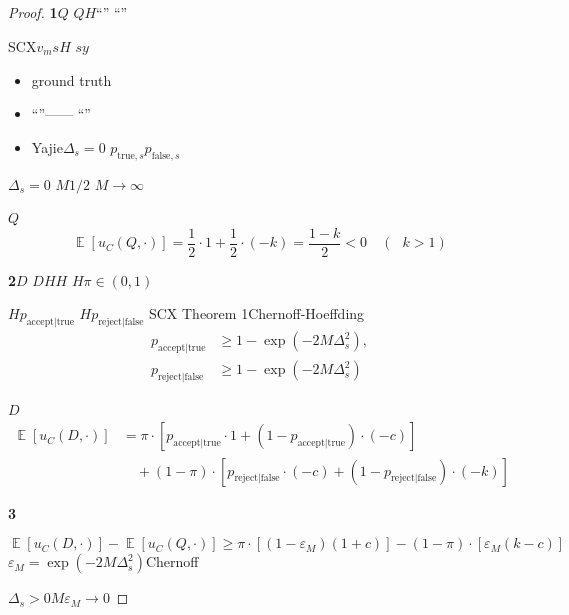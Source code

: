 \documentclass[11pt,a4paper]{article}
\theoremstyle{remark}
\DeclareMathOperator{\E}{\mathbb{E}}
\begin{document}
\subsection{}

\begin{proof}
\textbf{1$Q$}
$Q$$H$``''
``''

SCX$v_m$$s$$H$
$s$$y$
\begin{itemize}
    \item ground truth
    \item ``''——
          ``''
    \item Yajie$\Delta_s = 0$
          $p_{\text{true}, s}$$p_{\text{false}, s}$
\end{itemize}

$\Delta_s = 0$
$M$$1/2$
$M \to \infty$

$Q$
\begin{equation}
    \E[u_C(Q, \cdot)] = \frac{1}{2} \cdot 1 + \frac{1}{2} \cdot (-k)
    = \frac{1 - k}{2} < 0 \quad (\text{ } k > 1)
\end{equation}

\textbf{2$D$}
$D$$H$$H$
$H$$\pi \in (0, 1)$

$H$$p_{\text{accept}|\text{true}}$
$H$$p_{\text{reject}|\text{false}}$
SCX Theorem 1Chernoff-Hoeffding
\begin{align}
    p_{\text{accept}|\text{true}} &\geq 1 - \exp(-2M\Delta_s^2), \\
    p_{\text{reject}|\text{false}} &\geq 1 - \exp(-2M\Delta_s^2)
\end{align}

$D$
\begin{align}
    \E[u_C(D, \cdot)] &= \pi \cdot \left[p_{\text{accept}|\text{true}} \cdot 1
                         + (1 - p_{\text{accept}|\text{true}}) \cdot (-c)\right] \\
    &\quad + (1-\pi) \cdot \left[p_{\text{reject}|\text{false}} \cdot (-c)
                         + (1 - p_{\text{reject}|\text{false}}) \cdot (-k)\right] \nonumber
\end{align}

\textbf{3}

\begin{equation}
    \E[u_C(D, \cdot)] - \E[u_C(Q, \cdot)]
    \geq \pi \cdot \left[(1 - \varepsilon_M)(1 + c)\right]
       - (1-\pi) \cdot \left[\varepsilon_M (k - c)\right]
\end{equation}
$\varepsilon_M = \exp(-2M\Delta_s^2)$Chernoff

$\Delta_s > 0$$M$$\varepsilon_M \to 0$


\end{proof}
\end{document}
